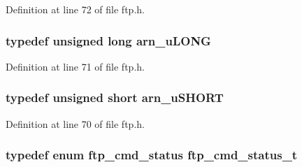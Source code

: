 Definition at line 72 of file ftp.h.

\hypertarget{group__ftp_ga8b49fa3351457a2ef5c6f2b84c227953}{
\subsubsection[{arn\_\-uLONG}]{\setlength{\rightskip}{0pt plus 5cm}typedef unsigned long {\bf arn\_\-uLONG}}}
\label{group__ftp_ga8b49fa3351457a2ef5c6f2b84c227953}


Definition at line 71 of file ftp.h.

\hypertarget{group__ftp_gaa290e3b930f0eff7f256b787fdbe02dc}{
\subsubsection[{arn\_\-uSHORT}]{\setlength{\rightskip}{0pt plus 5cm}typedef unsigned short {\bf arn\_\-uSHORT}}}
\label{group__ftp_gaa290e3b930f0eff7f256b787fdbe02dc}


Definition at line 70 of file ftp.h.

\hypertarget{group__ftp_gabd3273961dc774ec260204513c2cea90}{
\subsubsection[{ftp\_\-cmd\_\-status\_\-t}]{\setlength{\rightskip}{0pt plus 5cm}typedef enum {\bf ftp\_\-cmd\_\-status}  {\bf ftp\_\-cmd\_\-status\_\-t}}}
\label{group__ftp_gabd3273961dc774ec260204513c2cea90}



